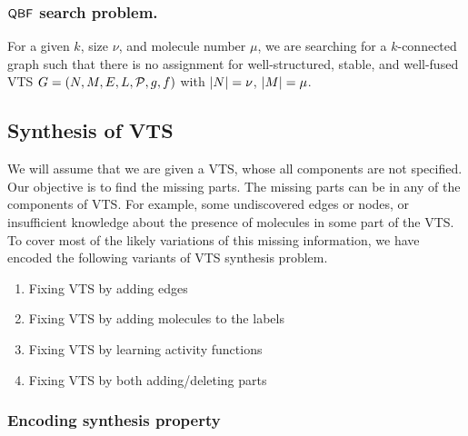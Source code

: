 \subsubsection{$\mathsf{QBF}$ search problem.} For a given $k$, size $\nu$, and molecule number $\mu$, we are searching for a $k$-connected graph such that there is no assignment for well-structured, stable, and well-fused VTS $G = (N,M,E,L,\mathcal{P},g,f)$ with $|N| = \nu$, $|M| = \mu$.    

%

\subsection{Synthesis of VTS}
We will assume that we are given a VTS, whose all components
are not specified.
%
Our objective is to find the missing parts.
%
The missing parts can be in any of the components of VTS. 
%
For example, some undiscovered edges or nodes, or insufficient
knowledge about the presence of molecules in some part of the VTS.
%
To cover most of the likely variations of this missing information,
we have encoded the following variants of VTS synthesis problem.

\begin{enumerate}
	\item Fixing VTS by adding edges 
	\item Fixing VTS by adding molecules to the labels
	\item Fixing VTS by learning activity functions
	\item  Fixing VTS by both adding/deleting parts
\end{enumerate}

\subsubsection{Encoding synthesis property}

